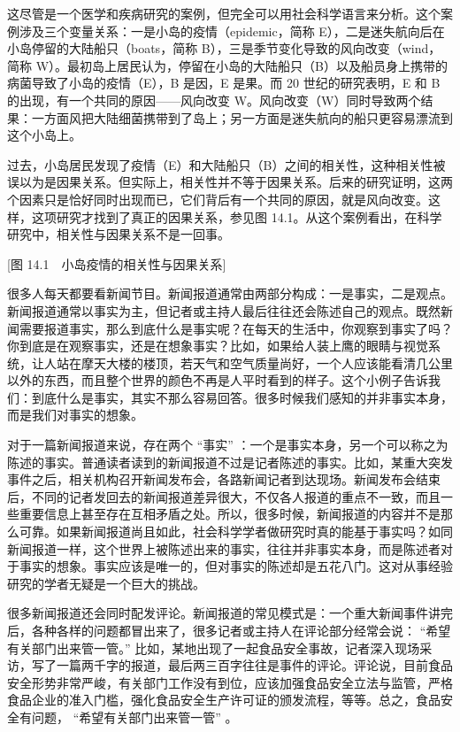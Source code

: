 这尽管是一个医学和疾病研究的案例，但完全可以用社会科学语言来分析。这个案例涉及三个变量关系：一是小岛的疫情（epidemic，简称 E），二是迷失航向后在小岛停留的大陆船只（boats，简称 B），三是季节变化导致的风向改变（wind，简称 W）。最初岛上居民认为，停留在小岛的大陆船只（B）以及船员身上携带的病菌导致了小岛的疫情（E），B 是因，E 是果。而 20 世纪的研究表明，E 和 B 的出现，有一个共同的原因——风向改变 W。风向改变（W）同时导致两个结果：一方面风把大陆细菌携带到了岛上；另一方面是迷失航向的船只更容易漂流到这个小岛上。

过去，小岛居民发现了疫情（E）和大陆船只（B）之间的相关性，这种相关性被误以为是因果关系。但实际上，相关性并不等于因果关系。后来的研究证明，这两个因素只是恰好同时出现而已，它们背后有一个共同的原因，就是风向改变。这样，这项研究才找到了真正的因果关系，参见图 14.1。从这个案例看出，在科学研究中，相关性与因果关系不是一回事。

[图 14.1　小岛疫情的相关性与因果关系]


很多人每天都要看新闻节目。新闻报道通常由两部分构成：一是事实，二是观点。新闻报道通常以事实为主，但记者或主持人最后往往还会陈述自己的观点。既然新闻需要报道事实，那么到底什么是事实呢？在每天的生活中，你观察到事实了吗？你到底是在观察事实，还是在想象事实？比如，如果给人装上鹰的眼睛与视觉系统，让人站在摩天大楼的楼顶，若天气和空气质量尚好，一个人应该能看清几公里以外的东西，而且整个世界的颜色不再是人平时看到的样子。这个小例子告诉我们：到底什么是事实，其实不那么容易回答。很多时候我们感知的并非事实本身，而是我们对事实的想象。

对于一篇新闻报道来说，存在两个 “事实” ：一个是事实本身，另一个可以称之为陈述的事实。普通读者读到的新闻报道不过是记者陈述的事实。比如，某重大突发事件之后，相关机构召开新闻发布会，各路新闻记者到达现场。新闻发布会结束后，不同的记者发回去的新闻报道差异很大，不仅各人报道的重点不一致，而且一些重要信息上甚至存在互相矛盾之处。所以，很多时候，新闻报道的内容并不是那么可靠。如果新闻报道尚且如此，社会科学学者做研究时真的能基于事实吗？如同新闻报道一样，这个世界上被陈述出来的事实，往往并非事实本身，而是陈述者对于事实的想象。事实应该是唯一的，但对事实的陈述却是五花八门。这对从事经验研究的学者无疑是一个巨大的挑战。

很多新闻报道还会同时配发评论。新闻报道的常见模式是：一个重大新闻事件讲完后，各种各样的问题都冒出来了，很多记者或主持人在评论部分经常会说： “希望有关部门出来管一管。” 比如，某地出现了一起食品安全事故，记者深入现场采访，写了一篇两千字的报道，最后两三百字往往是事件的评论。评论说，目前食品安全形势非常严峻，有关部门工作没有到位，应该加强食品安全立法与监管，严格食品企业的准入门槛，强化食品安全生产许可证的颁发流程，等等。总之，食品安全有问题， “希望有关部门出来管一管” 。

